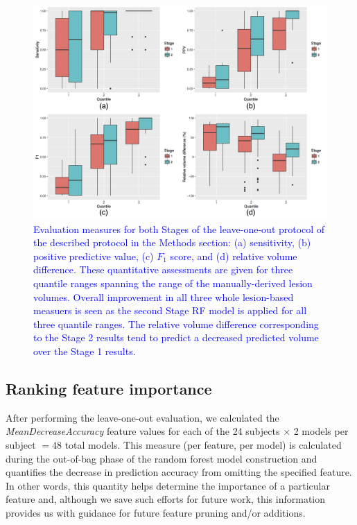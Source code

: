 \documentclass[11pt,]{article}
\begin{document}
\begin{figure}[htbp]
\centering
\includegraphics{Figures/evaluationResults.png}
\caption{\textcolor{blue}{Evaluation measures for both Stages of the leave-one-out protocol of the described protocol in the Methods
section:  (a) sensitivity, (b) positive predictive value, (c) $F_1$ score, and (d) relative
volume difference.   These quantitative assessments are given for three quantile ranges
spanning the range of the manually-derived lesion volumes.    Overall improvement in all
three whole lesion-based measuers is seen as the
second Stage RF model is applied for all three quantile ranges.
The relative volume difference corresponding to the Stage 2 results tend to predict a
decreased predicted volume over the Stage 1 results.}}
\end{figure}

\subsection{Ranking feature
importance}\label{ranking-feature-importance}

After performing the leave-one-out evaluation, we calculated the
\emph{MeanDecreaseAccuracy} feature values for each of the 24 subjects
\(\times\) 2 models per subject \(=48\) total models. This measure (per
feature, per model) is calculated during the out-of-bag phase of the
random forest model construction and quantifies the decrease in
prediction accuracy from omitting the specified feature. In other words,
this quantity helps determine the importance of a particular feature
and, although we save such efforts for future work, this information
provides us with guidance for future feature pruning and/or additions.
\end{document}
